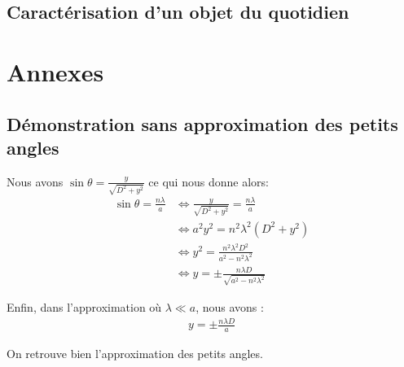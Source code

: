 \documentclass[12pt]{article}
\begin{document}
\subsection{Caractérisation d'un objet du quotidien}
\newpage

\section*{Annexes}
\subsection{Démonstration sans approximation des petits angles}
Nous avons $\sin \theta = \frac{y}{\sqrt{D^2+y^2}}$ ce qui nous donne alors:
\begin{align*}
    \sin \theta = \frac{n\lambda}{a} & \Leftrightarrow \frac{y}{\sqrt{D^2+y^2}} = \frac{n\lambda}{a} \\
    & \Leftrightarrow a^2y^2 = n^2 \lambda ^2 \left( D^2 + y^2 \right) \\
    & \Leftrightarrow y^2 = \frac{n^2 \lambda^2 D^2}{a^2 - n^2 \lambda^2} \\
    & \Leftrightarrow y = \pm \frac{n \lambda D}{\sqrt{a^2 - n^2 \lambda^2}}
\end{align*}

Enfin, dans l'approximation où $\lambda \ll a$, nous avons :
\begin{align}
    y = \pm \frac{n \lambda D}{a}
\end{align}

On retrouve bien l'approximation des petits angles.
\end{document}
